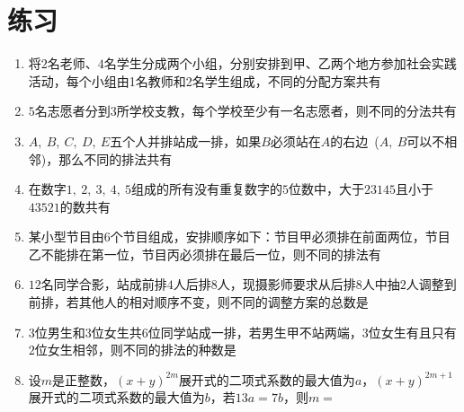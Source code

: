 \documentclass[marginline,noindent,answers,adobefonts]{BHCexam}
\begin{document}
\section{练习}
\begin{enumerate}[1)]

\item 将$2$名老师、$4$名学生分成两个小组，分别安排到甲、乙两个地方参加社会实践活动，每个小组由1名教师和2名学生组成，不同的分配方案共有\xx
{}
\item $5$名志愿者分到$ 3 $所学校支教，每个学校至少有一名志愿者，则不同的分法共有\xx
{}

\item $A,~B,~C,~D,~E$五个人并排站成一排，如果$ B $必须站在$ A $的右边~($A,~B$可以不相邻)，那么不同的排法共有\xx
{}
\item 在数字$ 1,~2,~3,~4,~5 $组成的所有没有重复数字的$ 5 $位数中，大于$ 23145 $且小于$ 43521 $的数共有\xx
{}
\item 某小型节目由$6$个节目组成，安排顺序如下：节目甲必须排在前面两位，节目乙不能排在第一位，节目丙必须排在最后一位，则不同的排法有\xx
{}
\item $12$名同学合影，站成前排$ 4 $人后排$ 8 $人，现摄影师要求从后排$ 8 $人中抽$ 2 $人调整到前排，若其他人的相对顺序不变，则不同的调整方案的总数是\xx
{}
\item $ 3 $位男生和$ 3 $位女生共$ 6 $位同学站成一排，若男生甲不站两端，$ 3 $位女生有且只有$ 2 $位女生相邻，则不同的排法的种数是\xx
{}

\item 设$ m $是正整数，$ (x+y)^{2m} $展开式的二项式系数的最大值为$ a $，$ (x+y)^{2m+1} $展开式的二项式系数的最大值为$ b $，若$ 13a=7b $，则$ m =$\xx
{}


\end{enumerate}
\end{document}
